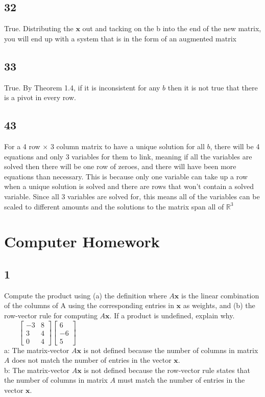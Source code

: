 \documentclass{article}
\begin{document}
\subsection*{32}
True. Distributing the $\mathbf{x}$ out and tacking on the b into the end of the new matrix, you will end up with a system that is in the form of an augmented matrix
\subsection*{33}
True. By Theorem 1.4, if it is inconsistent for any $b$ then it is not true that there is a pivot in every row.
\subsection*{43}
For a 4 row $\times$ 3 column matrix to have a unique solution for all $b$, there will be 4 equations and only 3 variables for them to link, meaning if all the variables are solved then there will be one row of zeroes, and there will have been more equations than necessary.
This is because only one variable can take up a row when a unique solution is solved and there are rows that won't contain a solved variable. Since all 3 variables are solved for, this means all of the variables can be scaled to different amounts and the solutions to the matrix span
all of $\mathbb{R}^3$ \pagebreak
\section*{Computer Homework}
\subsection*{1}
Compute the product using (a) the definition where $A\mathbf{x}$ is the linear combination of the columns of A using the corresponding entries in $\mathbf{x}$ as weights, and (b) the row-vector rule for computing $A\mathbf{x}$. If a product is undefined, explain why.
$\qquad \begin{bmatrix}
    -3&8\\3&4\\0&4
\end{bmatrix}
\begin{bmatrix}
6\\-6\\5
\end{bmatrix}$
\\[0.1in]a: The matrix-vector $A\mathbf{x}$ is not defined because the number of columns in matrix $A$ does not match the number of entries in the vector $\mathbf{x}$.
\\b: 
The matrix-vector $A\mathbf{x}$ is not defined because the row-vector rule states that the number of columns in matrix $A$ must match the number of entries in the vector $\mathbf{x}$.
\end{document}
